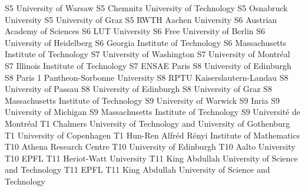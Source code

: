 \begin{multicols}{2}
{S5}
{}
{University of Warsaw}
{S5}
{}
{Chemnitz University of Technology}
{S5}
{}
{Osnabruck University}
{S5}
{}
{University of Graz}
{S5}
{}
{RWTH Aachen University}
{S6}
{}
{Austrian Academy of Sciences}
{S6}
{}
{LUT University}
{S6}
{}
{Free University of Berlin}
{S6}
{}
{University of Heidelberg}
{S6}
{}
{Georgia Institute of Technology}
{S6}
{}
{Massachusetts Institute of Technology}
{S7}
{}
{University of Washington}
{S7}
{}
{University of Montréal}
{S7}
{}
{Illinois Institute of Technology}
{S7}
{}
{ENSAE Paris}
{S8}
{}
{University of Edinburgh}
{S8}
{}
{Paris 1 Pantheon-Sorbonne University}
{S8}
{}
{RPTU Kaiserslautern-Landau}
{S8}
{}
{University of Passau}
{S8}
{}
{University of Edinburgh}
{S8}
{}
{University of Graz}
{S8}
{}
{Massachusetts Institute of Technology}
{S9}
{}
{University of Warwick}
{S9}
{}
{Inria}
{S9}
{}
{University of Michigan}
{S9}
{}
{Massachusetts Institute of Technology}
{S9}
{}
{Université de Montréal}
{T1}
{}
{Chalmers University of Technology and University of Gothenburg}
{T1}
{}
{University of Copenhagen}
{T1}
{}
{Hun-Ren Alfréd Rényi Institute of Mathematics}
{T10}
{}
{Athena Research Centre}
{T10}
{}
{University of Edinburgh}
{T10}
{}
{Aalto University}
{T10}
{}
{EPFL}
{T11}
{}
{Heriot-Watt University}
{T11}
{}
{King Abdullah University of Science and Technology}
{T11}
{}
{EPFL}
{T11}
{}
{King Abdullah University of Science and Technology}

\end{multicols}

